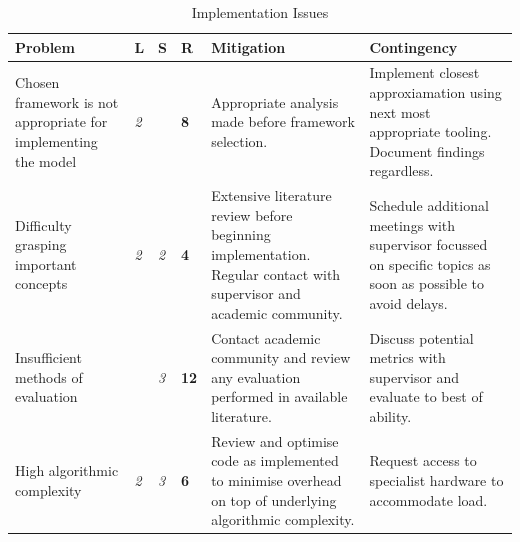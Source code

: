 \documentclass[12pt,a4,xcolor=table]{article}
\begin{document}
	\begin{table}[h!]
		\centering
		\caption{Implementation Issues}
		\label{table:risk3}
		\footnotesize
		\begin{tabular}{|>{\centering}m{1.5in} |>{\centering}m{0.1in} |>{\centering}m{0.1in} |>{\centering}m{0.3in} |>{\centering}m{1.8in} |>{\centering\arraybackslash}m{1.8in}|}
			\hline
			\textbf{Problem}                                               & \textbf{L}                                                & \textbf{S}                                                & \textbf{R}                          & \textbf{Mitigation}                                                                                                  & \textbf{Contingency}                                                                                          \\ \hline
			Chosen framework is not appropriate for implementing the model & \cellcolor[HTML]{F8FF00}\textit{2}                        & \cellcolor[HTML]{F88602}{\color[HTML]{333333} \textit{4}} & \cellcolor[HTML]{FFC702}\textbf{8}  & Appropriate analysis made before framework selection.                                                                & Implement closest approxiamation using next most appropriate tooling. Document findings regardless.           \\ \hline
			Difficulty grasping important concepts                         & \cellcolor[HTML]{F8FF00}\textit{2}                        & \cellcolor[HTML]{F8FF00}\textit{2}                        & \cellcolor[HTML]{F8FF00}\textbf{4}  & Extensive literature review before beginning implementation. Regular contact with supervisor and academic community. & Schedule additional meetings with supervisor focussed on specific topics as soon as possible to avoid delays. \\ \hline
			Insufficient methods of evaluation                             & \cellcolor[HTML]{F88602}{\color[HTML]{333333} \textit{4}} & \cellcolor[HTML]{FFC702}\textit{3}                        & \cellcolor[HTML]{F88602}\textbf{12} & Contact academic community and review any evaluation performed in available literature.                              & Discuss potential metrics with supervisor and evaluate to best of ability.                                    \\ \hline
			High algorithmic complexity                                    & \cellcolor[HTML]{F8FF00}\textit{2}                        & \cellcolor[HTML]{FFC702}\textit{3}                        & \cellcolor[HTML]{FFC702}\textbf{6}  & Review and optimise code as implemented to minimise overhead on top of underlying algorithmic complexity.            & Request access to specialist hardware to accommodate load.                                                    \\ \hline

\end{tabular}
\end{table}
\end{document}
